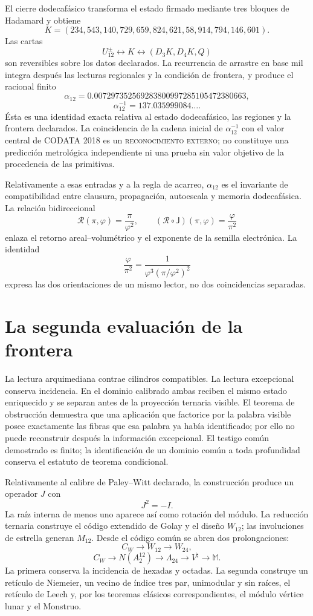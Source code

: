 El cierre dodecafásico transforma el estado firmado mediante tres bloques de
Hadamard y obtiene
\[
K=(234,543,140,729,659,824,621,58,914,794,146,601).
\]
Las cartas
\[
U_{12}^{\pm}
\longleftrightarrow K
\longleftrightarrow(D_3K,D_4K,Q)
\]
son reversibles sobre los datos declarados. La recurrencia de arrastre en
base mil integra después las lecturas regionales y la condición de frontera,
y produce el racional finito
\[
\alpha_{12}
=0.007297352569283800997285105472380663,
\]
\[
\alpha_{12}^{-1}=137.035999084\ldots.
\]
Ésta es una identidad exacta relativa al estado dodecafásico, las regiones y
la frontera declarados. La coincidencia de la cadena inicial de
\(\alpha_{12}^{-1}\) con el valor central de CODATA 2018 es un
\textsc{reconocimiento externo}; no constituye una predicción metrológica
independiente ni una prueba sin valor objetivo de la procedencia de las primitivas.

Relativamente a esas entradas y a la regla de acarreo, \(\alpha_{12}\) es el
invariante de compatibilidad entre clausura, propagación, autoescala y memoria
dodecafásica. La relación bidireccional
\[
\mathscr R(\pi,\varphi)=\frac{\pi}{\varphi^2},
\qquad
(\mathscr R\circ\mathsf J)(\pi,\varphi)=\frac{\varphi}{\pi^2}
\]
enlaza el retorno areal--volumétrico y el exponente de la semilla
electrónica. La identidad
\[
\frac{\varphi}{\pi^2}
=\frac{1}{\varphi^3(\pi/\varphi^2)^2}
\]
expresa las dos orientaciones de un mismo lector, no dos coincidencias
separadas.

\section{La segunda evaluación de la frontera}

La lectura arquimediana contrae cilindros compatibles. La lectura excepcional
conserva incidencia. En el dominio calibrado ambas reciben el mismo estado
enriquecido y se separan antes de la proyección ternaria visible. El teorema
de obstrucción demuestra que una aplicación que factorice por la palabra
visible posee exactamente las fibras que esa palabra ya había identificado;
por ello no puede reconstruir después la información excepcional. El testigo
común demostrado es finito; la identificación de un dominio común a toda
profundidad conserva el estatuto de teorema condicional.

Relativamente al calibre de Paley--Witt declarado, la construcción produce un
operador \(J\) con
\[
J^2=-I.
\]
La raíz interna de menos uno aparece así como rotación del módulo. La
reducción ternaria construye el código extendido de Golay y el diseño
\(W_{12}\); las involuciones de estrella generan \(M_{12}\). Desde el código
común se abren dos prolongaciones:
\[
C_W\longrightarrow W_{12}\longrightarrow W_{24},
\]
\[
C_W\longrightarrow N(A_2^{12})
\longrightarrow\Lambda_{24}
\longrightarrow V^\natural
\longrightarrow\mathbb M.
\]
La primera conserva la incidencia de hexadas y octadas. La segunda construye
un retículo de Niemeier, un vecino de índice tres par, unimodular y sin
raíces, el retículo de Leech y, por los teoremas clásicos correspondientes,
el módulo vértice lunar y el Monstruo.

